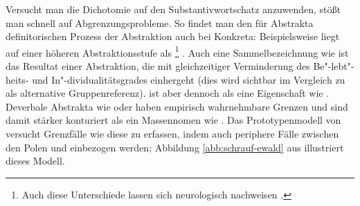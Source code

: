 Versucht man die Dichotomie  auf den Substantivwortschatz anzuwenden, stößt man schnell auf Abgrenzungsprobleme. So findet man den für Abstrakta definitorischen Prozess der Abstraktion auch bei Konkreta: Beispielsweise liegt  auf einer höheren Abstraktionsstufe als \footnote{Auch diese Unterschiede lassen sich neurologisch nachweisen \parencite[s.][]{Ghio2013}.} \parencite[274]{Ewald1992}. Auch eine Sammelbezeichnung wie  ist das Resultat einer Abstraktion, die mit gleichzeitiger Verminderung des Be"-lebt"-heits- und In"-dividualitätsgrades einhergeht (dies wird sichtbar im Vergleich zu  als alternative Gruppenreferenz).  ist aber dennoch  als eine Eigenschaft wie . Deverbale Abstrakta wie  oder  haben empirisch wahrnehmbare Grenzen und sind damit stärker konturiert als ein Massennomen wie . Das Prototypenmodell von \textcite[279--280]{Ewald1992} versucht Grenzfälle wie diese zu erfassen, indem auch periphere Fälle zwischen den Polen  und  einbezogen werden; Abbildung \ref{abb:schrauf-ewald} aus \textcite{Schrauf2011} illustriert dieses Modell.  

